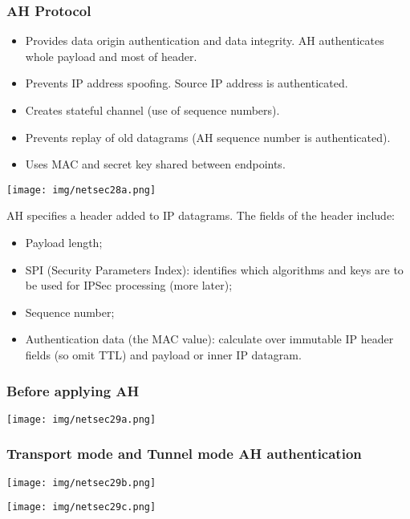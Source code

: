 \documentclass[a4paper, 10pt, titlepage]{article}
\begin{document}
\subsubsection{AH Protocol}
\begin{itemize}
	\item Provides data origin authentication and data integrity. AH authenticates whole payload and most of header. 
	\item Prevents IP address spoofing. Source IP address is authenticated.
	\item Creates stateful channel (use of sequence numbers).
	\item Prevents replay of old datagrams (AH sequence number is authenticated).
	\item Uses MAC and secret key shared between endpoints.
\end{itemize}
\begin{center}
	\texttt{[image: img/netsec28a.png]}
\end{center}
AH specifies a header added to IP datagrams. The fields of the header include:
\begin{itemize}
	\item Payload length;
	\item SPI (Security Parameters Index): identifies which algorithms and keys are to be used for IPSec processing (more later);
	\item Sequence number;
	\item Authentication data (the MAC value): calculate over immutable IP header fields (so omit TTL) and payload or inner IP datagram.
\end{itemize}

\subsubsection*{Before applying AH}
\begin{center}
	\texttt{[image: img/netsec29a.png]}
\end{center}
\subsubsection*{Transport mode and Tunnel mode AH authentication}
\begin{minipage}{0.45\textwidth}
	\begin{center}
		\texttt{[image: img/netsec29b.png]}
	\end{center}
\end{minipage}
\hfill
\begin{minipage}{0.45\textwidth}
	\begin{center}
		\texttt{[image: img/netsec29c.png]}
	\end{center}
\end{minipage}
\end{document}
